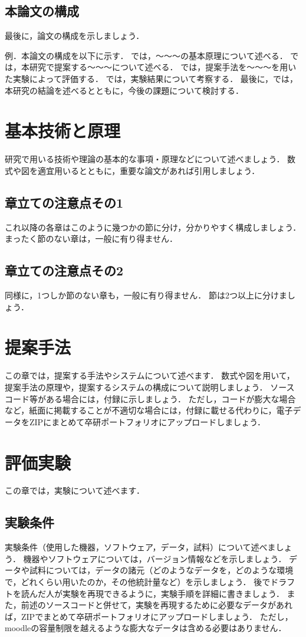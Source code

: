 \documentclass[uplatex,draft]{ipsjpapers}
\begin{document}
\subsection{本論文の構成}
最後に，論文の構成を示しましょう．
\par
例．本論文の構成を以下に示す．
\label{sec:fundamental}では，～～～の基本原理について述べる．
\label{sec:proposed}では，本研究で提案する～～～について述べる．
\label{sec:experiment}では，提案手法を～～～を用いた実験によって評価する．
\label{sec:discussion}では，実験結果について考察する．
最後に，\label{sec:conclusion}では，本研究の結論を述べるとともに，今後の課題について検討する．
%
%
\section{基本技術と原理}
\label{sec:fundamental}
研究で用いる技術や理論の基本的な事項・原理などについて述べましょう．
数式や図を適宜用いるとともに，重要な論文があれば引用しましょう．
%
\subsection{章立ての注意点その1}
これ以降の各章はこのように幾つかの節に分け，分かりやすく構成しましょう．
まったく節のない章は，一般に有り得ません．
%
\subsection{章立ての注意点その2}
同様に，1つしか節のない章も，一般に有り得ません．
節は2つ以上に分けましょう．
%
\section{提案手法}
\label{sec:proposed}
この章では，提案する手法やシステムについて述べます．
数式や図を用いて，提案手法の原理や，提案するシステムの構成について説明しましょう．
ソースコード等がある場合には，付録に示しましょう．
ただし，コードが膨大な場合など，紙面に掲載することが不適切な場合には，付録に載せる代わりに，電子データをZIPにまとめて卒研ポートフォリオにアップロードしましょう．
%
%
\section{評価実験}
\label{sec:experiment}
この章では，実験について述べます．
%
\subsection{実験条件}
実験条件（使用した機器，ソフトウェア，データ，試料）について述べましょう．
機器やソフトウェアについては，バージョン情報などを示しましょう．
データや試料については，データの諸元（どのようなデータを，どのような環境で，どれくらい用いたのか，その他統計量など）を示しましょう．
後でドラフトを読んだ人が実験を再現できるように，実験手順を詳細に書きましょう．
また，前述のソースコードと併せて，実験を再現するために必要なデータがあれば，ZIPでまとめて卒研ポートフォリオにアップロードしましょう．
ただし，moodleの容量制限を越えるような膨大なデータは含める必要はありません．
%
\end{document}
